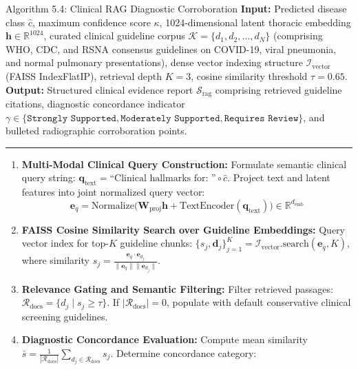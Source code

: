 \documentclass[12pt,a4paper]{report}
\begin{document}
\begin{algoBox}{Algorithm 5.4: Clinical RAG Diagnostic Corroboration}
\label{algo:clinical_rag}
\textbf{Input:} Predicted disease class $\hat{c}$, maximum confidence score $\kappa$, 1024-dimensional latent thoracic embedding $\mathbf{h} \in \mathbb{R}^{1024}$, curated clinical guideline corpus $\mathcal{K} = \{d_1, d_2, \dots, d_N\}$ (comprising WHO, CDC, and RSNA consensus guidelines on COVID-19, viral pneumonia, and normal pulmonary presentations), dense vector indexing structure $\mathcal{I}_{\text{vector}}$ (FAISS IndexFlatIP), retrieval depth $K = 3$, cosine similarity threshold $\tau = 0.65$.\\
\textbf{Output:} Structured clinical evidence report $\mathcal{S}_{\text{rag}}$ comprising retrieved guideline citations, diagnostic concordance indicator $\gamma \in \{\texttt{Strongly Supported}, \texttt{Moderately Supported}, \texttt{Requires Review}\}$, and bulleted radiographic corroboration points.\\[-6pt]
\noindent\rule{\linewidth}{0.4pt}
\begin{enumerate}[1:]
  \item \textbf{Multi-Modal Clinical Query Construction:} Formulate semantic clinical query string: $\mathbf{q}_{\text{text}} = \text{``Clinical hallmarks for: ''} \circ \hat{c}$. Project text and latent features into joint normalized query vector:
    \begin{equation*}
      \mathbf{e}_q = \mathrm{Normalize}\Big(\mathbf{W}_{\text{proj}} \mathbf{h} + \mathrm{TextEncoder}(\mathbf{q}_{\text{text}})\Big) \in \mathbb{R}^{d_{\text{emb}}}
    \end{equation*}
  \item \textbf{FAISS Cosine Similarity Search over Guideline Embeddings:} Query vector index for top-$K$ guideline chunks: $\{s_j, \mathbf{d}_j\}_{j=1}^K = \mathcal{I}_{\text{vector}}.\mathrm{search}(\mathbf{e}_q, K)$, where similarity $s_j = \frac{\mathbf{e}_q \cdot \mathbf{e}_{d_j}}{\|\mathbf{e}_q\| \|\mathbf{e}_{d_j}\|}$.
  \item \textbf{Relevance Gating and Semantic Filtering:} Filter retrieved passages: $\mathcal{R}_{\text{docs}} = \{d_j \mid s_j \ge \tau\}$. If $|\mathcal{R}_{\text{docs}}| = 0$, populate with default conservative clinical screening guidelines.
  \item \textbf{Diagnostic Concordance Evaluation:} Compute mean similarity $\bar{s} = \frac{1}{|\mathcal{R}_{\text{docs}}|} \sum_{d_j \in \mathcal{R}_{\text{docs}}} s_j$. Determine concordance category:

\end{enumerate}
\end{algoBox}
\end{document}
